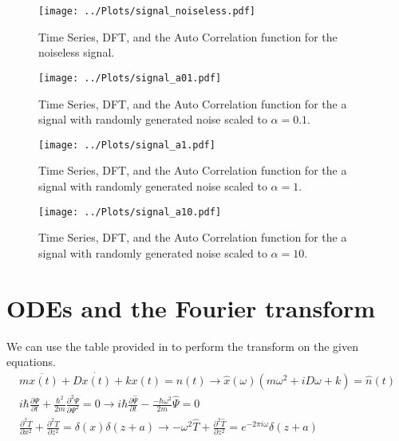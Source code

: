 \documentclass[twocolumn]{myarticle}
\begin{document}
\begin{figure}[ht]
    \centering
    \texttt{[image: ../Plots/signal\_noiseless.pdf]}
    \caption{Time Series, DFT, and the Auto Correlation function for the noiseless signal.}
    \label{fig:noiseless}
\end{figure}

\begin{figure}[ht]
    \centering
    \texttt{[image: ../Plots/signal\_a01.pdf]}
    \caption{Time Series, DFT, and the Auto Correlation function for the a signal with randomly generated noise scaled to $\alpha = 0.1$.}
    \label{fig:a01}
\end{figure}
\begin{figure}[ht]
    \centering
    \texttt{[image: ../Plots/signal\_a1.pdf]}
    \caption{Time Series, DFT, and the Auto Correlation function for the a signal with randomly generated noise scaled to $\alpha = 1$.}
    \label{fig:a1}
\end{figure}
\begin{figure}[ht]
    \centering
    \texttt{[image: ../Plots/signal\_a10.pdf]}
    \caption{Time Series, DFT, and the Auto Correlation function for the a signal with randomly generated noise scaled to $\alpha = 10$.}
    \label{fig:a10}
\end{figure}



\section{ODEs and the Fourier transform}
\label{sec:odes_and_the_fourier_transform}

We can use the table provided in to perform the transform on the given equations.
\begin{align}
m\ddot{x(t)} + D\dot{x(t)} + kx(t) = n(t) \rightarrow \hat{x}(\omega)(m\omega^{2} + iD\omega + k) = \hat{n}(t) \\
i\hbar \frac{\partial \Psi }{\partial t} + \frac{\hbar^{2}}{2m} \frac{\partial^2 \Psi}{\partial \Psi^2} = 0\rightarrow i\hbar \frac{\partial \hat{\Psi}}{\partial t} - \frac{-\hbar \omega^2}{2m}\hat{\Psi} = 0 \\
\frac{\partial^2 T}{\partial x^2} + \frac{\partial^2 T}{\partial z^2} = \delta (x) \delta(z+a) \rightarrow -\omega^2 \hat{T} + \frac{\partial^2 \hat{T}}{\partial z^2} = e^{-2\pi i \omega}\delta (z+a)
\end{align}
\end{document}
